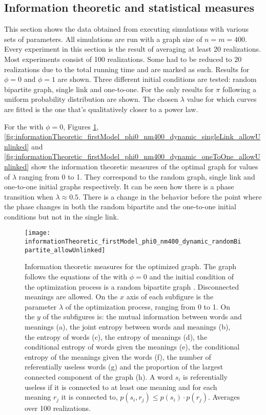 \subsection{Information theoretic and statistical measures}
\label{sec:results_new_other}

This section shows the data obtained from executing simulations with various sets of parameters.
All simulations are run with a graph size of $n=m=400$.
Every experiment in this section is the result of averaging at least 20 realizations.
Most experiments consist of 100 realizations.
Some had to be reduced to 20 realizations due to the total running time and are marked as such.
Results for $\phi=0$ and $\phi=1$ are shown.
Three different initial conditions are tested: random bipartite graph, single link and one-to-one.
For the \secondmodel{} only results for $\pi$ following a uniform probability distribution are shown.
The chosen $\lambda$ value for which curves are fitted is the one that's qualitatively closer to a power law.

For the \firstmodel{} with $\phi=0$, Figures \ref{fig:informationTheoretic_firstModel_phi0_nm400_dynamic_randomBipartite_allowUnlinked}, \ref{fig:informationTheoretic_firstModel_phi0_nm400_dynamic_singleLink_allowUnlinked} and \ref{fig:informationTheoretic_firstModel_phi0_nm400_dynamic_oneToOne_allowUnlinked} show the information theoretic measures of the optimal graph for values of $\lambda$ ranging from 0 to 1.
They correspond to the random graph, single link and one-to-one initial graphs respectively. It can be seen how there is a phase transition when $\lambda \approx 0.5$.
There is a change in the behavior before the point where the phase changes in both the random bipartite and the one-to-one initial conditions but not in the single link.

\begin{figure}
  \centering
  \texttt{[image: informationTheoretic\_firstModel\_phi0\_nm400\_dynamic\_randomBipartite\_allowUnlinked]}
  \caption{
    Information theoretic measures for the optimized graph.
    The graph follows the equations of the \firstmodel{} with $\phi=0$ and the initial condition of the optimization process is a random bipartite graph . Disconnected meanings are allowed.
    On the $x$ axis of each subfigure is the parameter $\lambda$ of the optimization process, ranging from 0 to 1.
    On the $y$ of the subfigures is: the mutual information between words and meanings (a), the joint entropy between words and meanings (b), the entropy of words (c), the entropy of meanings (d), the conditional entropy of words given the meanings (e), the conditional entropy of the meanings given the words (f), the number of referentially useless words (g) and the proportion of the largest connected component of the graph (h).
    A word $s_i$ is referentially useless if it is connected to at least one meaning and for each meaning $r_j$ it is connected to, $p(s_i,r_j) \leq p(s_i) \cdot p(r_j)$.
    Averages over 100 realizations.
}
  \label{fig:informationTheoretic_firstModel_phi0_nm400_dynamic_randomBipartite_allowUnlinked}
\end{figure}

